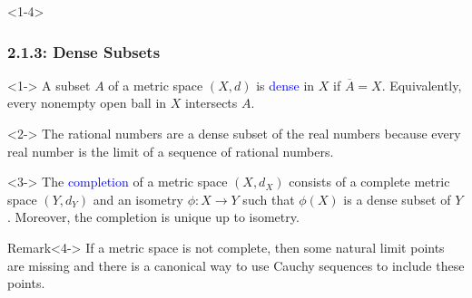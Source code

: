 \documentclass[10pt,english,aspectratio=169]{beamer}
\begin{document}
\begin{frame}<1-4> \frametitle{2.1.3: Dense Subsets}

\begin{definition}<1->
A subset $A$ of a metric space $(X,d)$ is \textcolor{blue}{dense} in $X$ if $\overline{A}=X$.
Equivalently, every nonempty open ball in $X$ intersects $A$.
\end{definition}

\begin{example}<2->
The rational numbers are a dense subset of the real numbers because every real number is the limit of a sequence of rational numbers.
\end{example}

\begin{definition}<3->
The \textcolor{blue}{completion} of a metric space $(X,d_X)$ consists of a complete metric space $(Y,d_Y)$ and an isometry $\phi  \colon X \rightarrow Y$ such that $\phi(X)$ is a dense subset of $Y$.
Moreover, the completion is unique up to isometry.
\end{definition}

\begin{alertblock}{Remark}<4->
If a metric space is not complete, then some natural limit points are missing and there is a canonical way to use Cauchy sequences to include these points.
\end{alertblock}


\end{frame}
\end{document}
